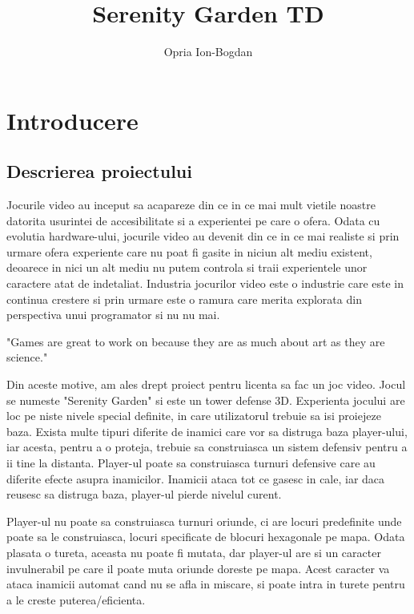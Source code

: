 \documentclass[12pt, a4paper]{article}
\title{\bf Serenity Garden TD}
\author{Opria Ion-Bogdan}
\begin{document}
	\maketitle
	
	\tableofcontents
	\pagebreak
	
	\section{Introducere}
	
	\subsection{Descrierea proiectului}
	
	Jocurile video au inceput sa acapareze din ce in ce mai mult vietile noastre datorita usurintei de accesibilitate si a experientei pe care o ofera. Odata cu evolutia hardware-ului, jocurile video au devenit din ce in ce mai realiste si prin urmare ofera experiente care nu poat fi gasite in niciun alt mediu existent, deoarece in nici un alt mediu nu putem controla si traii experientele unor caractere atat de indetaliat. Industria jocurilor video este o industrie care este in continua crestere si prin urmare este o ramura care merita explorata din perspectiva unui programator si nu nu mai. 
	
	"Games are great to work on because they are as much about art as they are science." \cite{gameProgrammingComplete}
	
	Din aceste motive, am ales drept proiect pentru licenta sa fac un joc video. Jocul se numeste "Serenity Garden" si este un tower defense 3D. Experienta jocului are loc pe niste nivele special definite, in care utilizatorul trebuie sa isi proiejeze baza. Exista multe tipuri diferite de inamici care vor sa distruga baza player-ului, iar acesta, pentru a o proteja, trebuie sa construiasca un sistem defensiv pentru a ii tine la distanta. Player-ul poate sa construiasca turnuri defensive care au diferite efecte asupra inamicilor. Inamicii ataca tot ce gasesc in cale, iar daca reusesc sa distruga baza, player-ul pierde nivelul curent.
	
	Player-ul nu poate sa construiasca turnuri oriunde, ci are locuri predefinite unde poate sa le construiasca, locuri specificate de blocuri hexagonale pe mapa. Odata plasata o tureta, aceasta nu poate fi mutata, dar player-ul are si un caracter invulnerabil pe care il poate muta oriunde doreste pe mapa. Acest caracter va ataca inamicii automat cand nu se afla in miscare, si poate intra in turete pentru a le creste puterea/eficienta.
	
\end{document}
